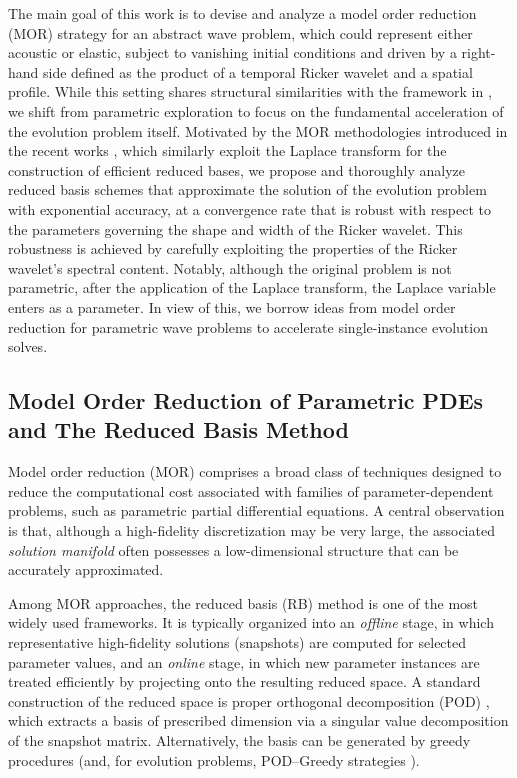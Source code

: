 The main goal of this work is to devise and analyze a model order reduction (MOR)
strategy for an abstract wave problem, which could represent either acoustic or elastic, subject to
vanishing initial conditions and driven by a right-hand side defined as the product
of a temporal Ricker wavelet and a spatial profile.
While this setting shares structural similarities with the framework in \cite{hawkins2025model}, we shift from parametric exploration to focus on the fundamental acceleration of the evolution problem itself.
Motivated by the MOR methodologies introduced in the recent works
\cite{henriquez2024fast,HenriquezHesthaven2024}, which similarly exploit the Laplace
transform for the construction of efficient reduced bases, we propose and
thoroughly analyze reduced basis schemes that approximate the solution of the
evolution problem with exponential accuracy, at a convergence rate that is robust
with respect to the parameters governing the shape and width of the Ricker wavelet.
This robustness is achieved by carefully exploiting the properties of the Ricker wavelet’s spectral content.
Notably, although the original problem is not parametric, after the application of the
Laplace transform, the Laplace variable enters as a parameter. 
In view of this, we borrow ideas from model order reduction for parametric wave problems to accelerate single-instance evolution solves.

\subsection{Model Order Reduction of Parametric PDEs and The Reduced Basis Method}
\label{sec:mor_parametric_PDEs}
Model order reduction (MOR) comprises a broad class of techniques designed to
reduce the computational cost associated with families of parameter-dependent
problems, such as parametric partial differential equations.
A central observation is that, although a high-fidelity discretization may be
very large, the associated {\it solution manifold} often possesses a low-dimensional
structure that can be accurately approximated.

Among MOR approaches, the reduced basis (RB) method is one of the most widely used
frameworks.
It is typically organized into an {\it offline} stage, in which representative
high-fidelity solutions (snapshots) are computed for selected parameter values,
and an {\it online} stage, in which new parameter instances are treated efficiently
by projecting onto the resulting reduced space.
A standard construction of the reduced space is proper orthogonal decomposition (POD)
\cite{berkooz1993proper,kunisch2001galerkin,liang2002proper}, which extracts a basis
of prescribed dimension via a singular value decomposition of the snapshot matrix.
Alternatively, the basis can be generated by greedy procedures
\cite{hesthaven2014efficient,bui-thanh_model_2008,buffa_priori_2012,devore_greedy_2013}
(and, for evolution problems, POD--Greedy strategies
\cite{haasdonk2013convergence,siena2023introduction}).

